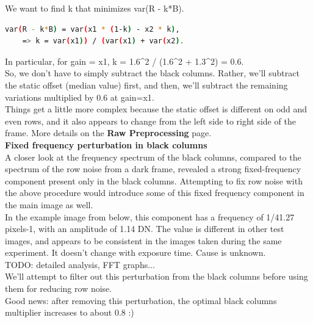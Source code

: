 {We want to find k that minimizes var(R - k*B). 

\begin{lstlisting}[language=bash,morekeywords=$,keywordstyle=\bfseries,frame=none,xleftmargin=.25in,belowskip=2em, aboveskip=2em]
    var(R - k*B) = var(x1 * (1-k) - x2 * k),
    => k = var(x1)) / (var(x1) + var(x2).
\end{lstlisting}

In particular, for gain = x1, k = 1.6^2 / (1.6^2 + 1.3^2) = 0.6.\\

So, we don't have to simply subtract the black columns. Rather, we'll subtract the static offset (median value) first, and then, we'll subtract the remaining variations multiplied by 0.6 at gain=x1.\\

Things get a little more complex because the static offset is different on odd and even rows, and it also appears to change from the left side to right side of the frame. More details on the \textbf{Raw Preprocessing} page.\\

\textbf{Fixed frequency perturbation in black columns }\\

A closer look at the frequency spectrum of the black columns, compared to the spectrum of the row noise from a dark frame, revealed a strong fixed-frequency component present only in the black columns. Attempting to fix row noise with the above procedure would introduce some of this fixed frequency component in the main image as well.\\

In the example image from below, this component has a frequency of 1/41.27 pixels-1, with an amplitude of 1.14 DN. The value is different in other test images, and appears to be consistent in the images taken during the same experiment. It doesn't change with exposure time. Cause is unknown. \\

TODO: detailed analysis, FFT graphs...\\

We'll attempt to filter out this perturbation from the black columns before using them for reducing row noise.\\

Good news: after removing this perturbation, the optimal black columns multiplier increases to about 0.8 :) \\

}
